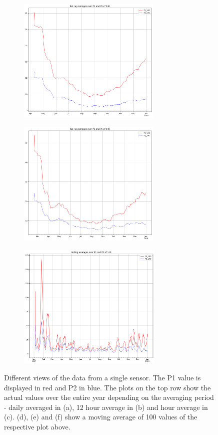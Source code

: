 \documentclass[12pt,a4paper,twoside]{scrartcl}
\numberwithin{equation}{section}
\begin{document}
\begin{figure}[H]
  \begin{subfigure}[t]{0.32\textwidth}
    \includegraphics[width=\textwidth,height=6cm]{figures/1D_140_rolling_plot_}%
    \label{fig:y equals x}
    \caption{}
  \end{subfigure}
  \begin{subfigure}[t]{0.32\textwidth}
    \includegraphics[width=\textwidth,height=6cm]{figures/12H_140_rolling_plot_}%
    \label{fig:y equals x}
    \caption{}
  \end{subfigure}
  \begin{subfigure}[t]{0.32\textwidth}
    \includegraphics[width=\textwidth,height=6cm]{figures/1H_140_rolling_plot_}%
    \subcaption{}
  \end{subfigure}      
  \caption{Different views of the data from a single sensor. The P1 value is displayed in red and P2 in blue. The plots on the top row show the actual values over the entire year depending on the averaging period - daily averaged in (a), 12 hour average in (b) and hour average in (c). (d), (e) and (f) show a moving average of 100 values of the respective plot above.}\label{fig:sensor_plots}
\end{figure}
\end{document}
